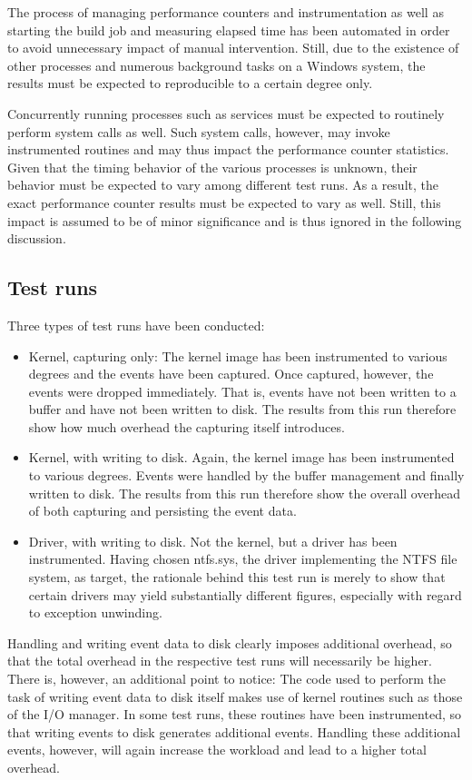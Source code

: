 The process of managing performance counters and instrumentation as well as starting the 
build job and measuring elapsed time has been automated in order to avoid unnecessary impact 
of manual intervention. Still, due to the existence of other processes and numerous background 
tasks on a Windows system, the results must be expected to reproducible to a certain degree only.

Concurrently running processes such as services must be expected to routinely perform system calls as well. 
Such system calls, however, may invoke instrumented routines and may thus impact the performance 
counter statistics. Given that the timing behavior of the various processes is unknown, their
behavior must be expected to vary among different test runs. As a result, the exact performance
counter results must be expected to vary as well. Still, this impact is assumed to be of minor 
significance and is thus ignored in the following discussion.

\subsection{Test runs}
Three types of test runs have been conducted:

\begin{itemize}
	\item	Kernel, capturing only: The kernel image has been instrumented to various degrees and
				the events have been captured. Once captured, however, the events were dropped immediately.
				That is, events have not been written to a buffer and have not been written to disk. The results
				from this run therefore show how much overhead the capturing itself introduces.
	\item Kernel, with writing to disk. Again, the kernel image has been instrumented to various 
				degrees. Events were handled by the buffer management and finally written to disk. The
				results from this run therefore show the overall overhead of both capturing and persisting
				the event data. 
	\item Driver, with writing to disk. Not the kernel, but a driver has been instrumented. Having
				chosen ntfs.sys, the driver implementing the NTFS file system, as target, the rationale 
				behind this test run is merely to show that 
				certain drivers may yield substantially different figures, especially with regard to
				exception unwinding.
\end{itemize}

Handling and writing event data to disk clearly imposes additional overhead, so that the
total overhead in the respective test runs will necessarily be higher. There is, however,
an additional point to notice: The code used to perform the task of writing event data to disk 
itself makes use of kernel routines such as those of the I/O manager. In some test runs, these 
routines have been instrumented, so that writing events to disk generates additional events.
Handling these additional events, however, will again increase the workload and lead to 
a higher total overhead.

